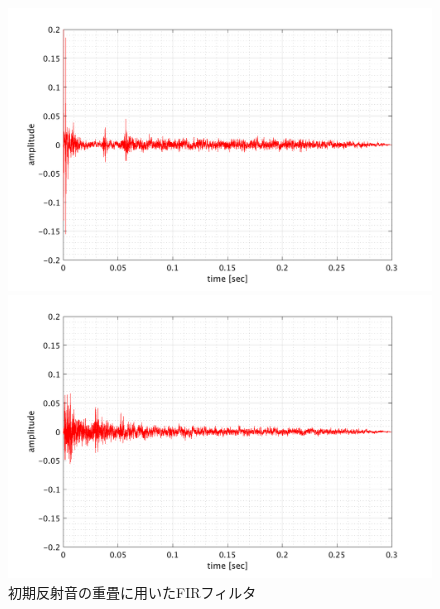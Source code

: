 \documentclass[11pt,a4j]{jreport}
\begin{document}
\begin{figure}[H]
      \begin{minipage}[b]{.5\linewidth}
          \centering
          \includegraphics[width=.9\linewidth]{images/convolutedIr/ER3.png}
      \end{minipage}%
      \begin{minipage}[b]{.5\linewidth}
          \centering
          \includegraphics[width=.9\linewidth]{images/convolutedIr/ER4.png}
      \end{minipage}

      \centering
      \caption{初期反射音の重畳に用いたFIRフィルタ}
      \label{fig:初期反射音の重畳に用いたFIRフィルタ}
    \end{figure}
\end{document}
